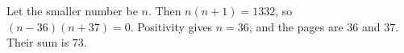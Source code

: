 Let the smaller number be $n$. Then $n(n+1)=1332$, so $(n-36)(n+37)=0$. Positivity gives $n=36$, and the pages are $36$ and $37$. Their sum is $\boxed{73}$.
